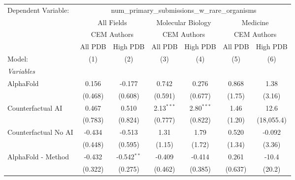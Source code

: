 \begingroup
\centering
\begin{tabular}{lcccccc}
   \tabularnewline \midrule \midrule
   Dependent Variable: & \multicolumn{6}{c}{num\_primary\_submissions\_w\_rare\_organisms}\\
 & \multicolumn{2}{c}{All Fields} & \multicolumn{2}{c}{Molecular Biology} & \multicolumn{2}{c}{Medicine} \\
\cmidrule(lr){2-3} \cmidrule(lr){4-5} \cmidrule(lr){6-7}
 & \multicolumn{2}{c}{CEM Authors} & \multicolumn{2}{c}{CEM Authors} & \multicolumn{2}{c}{CEM Authors} \\
\cmidrule(lr){2-3} \cmidrule(lr){4-5} \cmidrule(lr){6-7}
 & \multicolumn{1}{c}{All PDB} & \multicolumn{1}{c}{High PDB} & \multicolumn{1}{c}{All PDB} & \multicolumn{1}{c}{High PDB} & \multicolumn{1}{c}{All PDB} & \multicolumn{1}{c}{High PDB} \\
\cmidrule(lr){2-2} \cmidrule(lr){3-3} \cmidrule(lr){4-4} \cmidrule(lr){5-5} \cmidrule(lr){6-6} \cmidrule(lr){7-7}
   Model:                                                     & (1)          & (2)           & (3)           & (4)           & (5)     & (6)\\  
   \midrule
   \emph{Variables}\\
   AlphaFold                                                  & 0.156        & -0.177        & 0.742         & 0.276         & 0.868   & 1.38\\   
                                                              & (0.468)      & (0.608)       & (0.591)       & (0.677)       & (1.75)  & (3.16)\\   
   Counterfactual AI                                          & 0.467        & 0.510         & 2.13$^{***}$  & 2.80$^{***}$  & 1.46    & 12.6\\   
                                                              & (0.783)      & (0.824)       & (0.777)       & (0.822)       & (1.20)  & (18,055.4)\\   
   Counterfactual No AI                                       & -0.434       & -0.513        & 1.31          & 1.79          & 0.520   & -0.092\\   
                                                              & (0.448)      & (0.595)       & (1.15)        & (1.72)        & (1.34)  & (3.36)\\   
   AlphaFold - Method                                         & -0.432       & -0.542$^{**}$ & -0.409        & -0.414        & 0.261   & -10.4\\   
                                                              & (0.322)      & (0.275)       & (0.462)       & (0.385)       & (0.637) & (20.2)\\   

\end{tabular}
